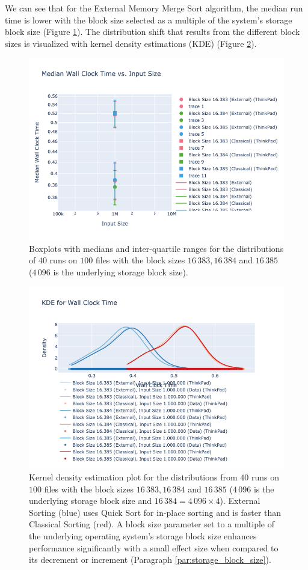 \documentclass[twocolumn]{article}
\begin{document}
We can see that for the External Memory Merge Sort algorithm, the median run time is lower with the block size selected as a multiple of the system's storage block size
(Figure \ref{fig:visualization_multiples_block_size.png}).
The distribution shift that results from the different block sizes is visualized with kernel density estimations (KDE) (Figure \ref{fig:kde_plot_multiples_block_size.png}).
\begin{figure}
    \centering
    \includegraphics[width=0.8 \textwidth]{./res/visualization_multiples_block_size.png}
    \caption{Boxplots with medians and inter-quartile ranges for the distributions of \( 40 \) runs on \( 100 \) files with the block sizes \( 16\,383, 16\,384 \) and \( 16\,385\) (\(4\,096\) is
        the underlying storage block size).}
    \label{fig:visualization_multiples_block_size.png}
\end{figure}
\begin{figure}
    \centering
    \includegraphics[width=0.8 \textwidth]{./res/kde_plot_multiples_block_size.png}
    \caption{Kernel density estimation plot for the distributions from \( 40 \) runs on \( 100 \) files with the block sizes \( 16\,383, 16\,384 \) and \( 16\,385 \) (\(4\,096\) is the underlying storage block size and
        \( 16\,384 = 4\,096 \times 4 \)). External Sorting (blue) uses Quick Sort for in-place sorting and is faster than Classical Sorting (red). A block size parameter set to a multiple of the underlying operating system's storage block size enhances performance significantly with a small effect size when compared to its decrement or increment (Paragraph \ref{par:storage_block_size}).}
    \label{fig:kde_plot_multiples_block_size.png}
\end{figure}
\end{document}
